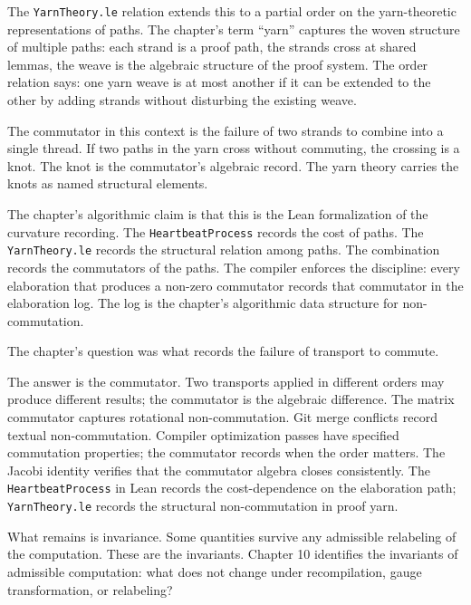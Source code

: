 The \texttt{YarnTheory.le} relation extends this to a partial order
on the yarn-theoretic representations of paths. The chapter's term
``yarn'' captures the woven structure of multiple paths: each
strand is a proof path, the strands cross at shared lemmas, the
weave is the algebraic structure of the proof system. The order
relation says: one yarn weave is at most another if it can be
extended to the other by adding strands without disturbing the
existing weave.

The commutator in this context is the failure of two strands to
combine into a single thread. If two paths in the yarn cross
without commuting, the crossing is a knot. The knot is the
commutator's algebraic record. The yarn theory carries the
knots as named structural elements.

The chapter's algorithmic claim is that this is the Lean
formalization of the curvature recording. The
\texttt{HeartbeatProcess} records the cost of paths. The
\texttt{YarnTheory.le} records the structural relation among paths.
The combination records the commutators of the paths. The
compiler enforces the discipline: every elaboration that produces
a non-zero commutator records that commutator in the elaboration
log. The log is the chapter's algorithmic data structure for
non-commutation.

\begin{bridge}

The chapter's question was what records the failure of transport to
commute.

The answer is the commutator. Two transports applied in different
orders may produce different results; the commutator is the algebraic
difference. The matrix commutator captures rotational non-commutation.
Git merge conflicts record textual non-commutation. Compiler
optimization passes have specified commutation properties; the
commutator records when the order matters. The Jacobi identity
verifies that the commutator algebra closes consistently. The
\texttt{HeartbeatProcess} in Lean records the cost-dependence on
the elaboration path; \texttt{YarnTheory.le} records the structural
non-commutation in proof yarn.

What remains is invariance. Some quantities survive any admissible
relabeling of the computation. These are the invariants. Chapter 10
identifies the invariants of admissible computation: what does not
change under recompilation, gauge transformation, or relabeling?

\end{bridge}

